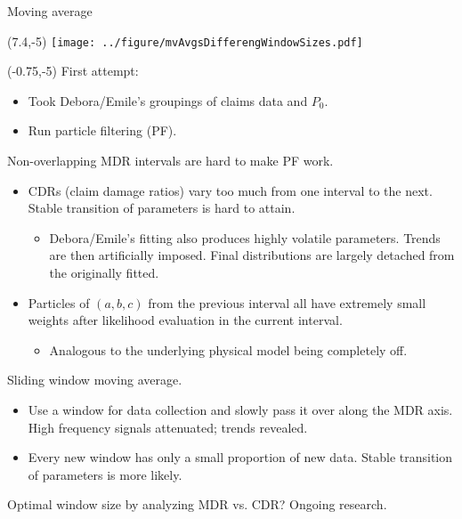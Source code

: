 \documentclass[aspectratio=169]{beamer}
\begin{document}
\begin{frame}{Moving average}
\begin{textblock}{1}(7.4,-5)
\texttt{[image: ../figure/mvAvgsDifferengWindowSizes.pdf]}
\end{textblock}

\begin{textblock}{7.7}(-0.75,-5)
\tiny First attempt:\smallskip

\begin{itemize}
\tiny \item Took Debora/Emile's groupings of claims data and $P_0$.

\tiny \item Run particle filtering (PF).\medskip%
\end{itemize}

\tiny Non-overlapping MDR intervals are hard to make PF work.\smallskip

\begin{itemize}
\tiny \item CDRs (claim damage ratios) vary too much from one interval to the next. Stable transition of parameters is hard to attain.\smallskip

\begin{itemize}
\tiny \item Debora/Emile's fitting also produces highly volatile parameters. Trends are then artificially imposed. Final distributions are largely detached from the originally fitted.
\end{itemize}\medskip%

\tiny \item Particles of $(a, b, c)$ from the previous interval all have extremely small weights after likelihood evaluation in the current interval.\medskip

\begin{itemize}
\tiny \item Analogous to the underlying physical model being completely off.
\end{itemize}
\end{itemize}\medskip%

\tiny Sliding window moving average.\smallskip

\begin{itemize}
\item Use a window for data collection and slowly pass it over along the MDR axis. High frequency signals attenuated; trends revealed.\medskip%

\item Every new window has only a small proportion of new data. Stable transition of parameters is more likely.\medskip%
\end{itemize}

\tiny Optimal window size by analyzing MDR vs. CDR? Ongoing research. 


\end{textblock}
\end{frame}
\end{document}
